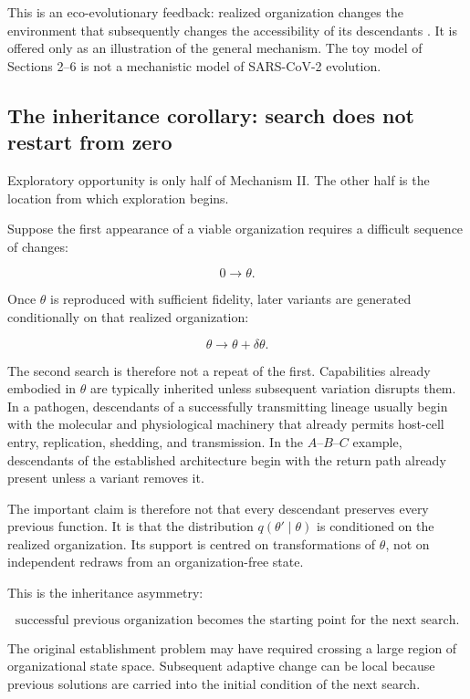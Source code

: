 \documentclass[11pt,a4paper]{article}
\begin{document}
This is an eco-evolutionary feedback: realized organization changes the
environment that subsequently changes the accessibility of its
descendants \citep{Ferriere2013}. It is offered only as an illustration
of the general mechanism. The toy model of Sections 2--6 is not a
mechanistic model of SARS-CoV-2 evolution.

\subsection{The inheritance corollary: search does not restart from
zero}\label{the-inheritance-corollary-search-does-not-restart-from-zero}

Exploratory opportunity is only half of Mechanism II. The other half is
the location from which exploration begins.

Suppose the first appearance of a viable organization requires a
difficult sequence of changes:

\[
0
\longrightarrow
\theta.
\]

Once \(\theta\) is reproduced with sufficient fidelity, later variants
are generated conditionally on that realized organization:

\[
\theta
\longrightarrow
\theta+\delta\theta.
\]

The second search is therefore not a repeat of the first. Capabilities
already embodied in \(\theta\) are typically inherited unless subsequent
variation disrupts them. In a pathogen, descendants of a successfully
transmitting lineage usually begin with the molecular and physiological
machinery that already permits host-cell entry, replication, shedding,
and transmission. In the \(A\)--\(B\)--\(C\) example, descendants of the
established architecture begin with the return path already present
unless a variant removes it.

The important claim is therefore not that every descendant preserves
every previous function. It is that the distribution
\(q(\theta'\mid\theta)\) is conditioned on the realized organization.
Its support is centred on transformations of \(\theta\), not on
independent redraws from an organization-free state.

This is the inheritance asymmetry:

\[
\boxed{
\text{successful previous organization becomes the starting point for the next search.}
}
\]

The original establishment problem may have required crossing a large
region of organizational state space. Subsequent adaptive change can be
local because previous solutions are carried into the initial condition
of the next search.
\end{document}
